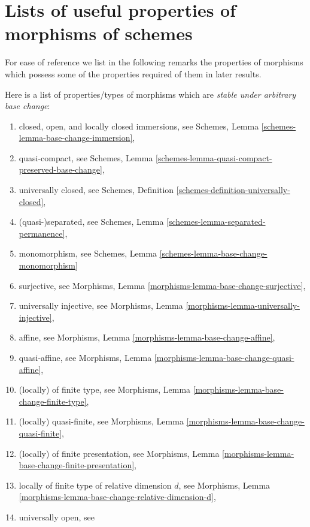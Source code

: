 \section{Lists of useful properties of morphisms of schemes}
\label{section-lists}

\noindent
For ease of reference we list in the following remarks the
properties of morphisms which possess some of the properties
required of them in later results.

\begin{remark}
\label{remark-list-properties-stable-base-change}
Here is a list of properties/types of morphisms
which are {\it stable under arbitrary base change}:
\begin{enumerate}
\item closed, open, and locally closed immersions, see
Schemes, Lemma \ref{schemes-lemma-base-change-immersion},
\item quasi-compact, see
Schemes, Lemma \ref{schemes-lemma-quasi-compact-preserved-base-change},
\item universally closed, see
Schemes, Definition \ref{schemes-definition-universally-closed},
\item (quasi-)separated, see
Schemes, Lemma \ref{schemes-lemma-separated-permanence},
\item monomorphism, see
Schemes, Lemma \ref{schemes-lemma-base-change-monomorphism}
\item surjective, see
Morphisms, Lemma \ref{morphisms-lemma-base-change-surjective},
\item universally injective, see
Morphisms, Lemma \ref{morphisms-lemma-universally-injective},
\item affine, see
Morphisms, Lemma \ref{morphisms-lemma-base-change-affine},
\item quasi-affine, see
Morphisms, Lemma \ref{morphisms-lemma-base-change-quasi-affine},
\item (locally) of finite type, see
Morphisms, Lemma \ref{morphisms-lemma-base-change-finite-type},
\item (locally) quasi-finite, see
Morphisms, Lemma \ref{morphisms-lemma-base-change-quasi-finite},
\item (locally) of finite presentation, see
Morphisms, Lemma \ref{morphisms-lemma-base-change-finite-presentation},
\item locally of finite type of relative dimension $d$, see
Morphisms, Lemma \ref{morphisms-lemma-base-change-relative-dimension-d},
\item universally open, see

\end{enumerate}
\end{remark}
